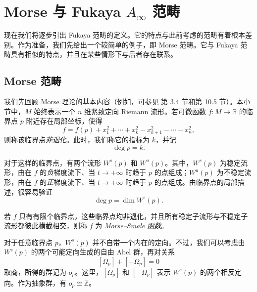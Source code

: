 \section{Morse 与 Fukaya \texorpdfstring{$A_\infty$}{A∞} 范畴}\label{sec:8.3}

现在我们将逐步引出 Fukaya 范畴的定义。它的特点与此前考虑的范畴有着根本差别。作为准备，我们先给出一个较简单的例子，即 Morse 范畴。它与 Fukaya 范畴具有相似的特点，并且在某些情形下与后者存在联系。

\subsection{Morse 范畴}\label{sec:8.3.1}

我们先回顾 Morse 理论的基本内容（例如，可参见  第 3.4 节和第 10.5 节）。本小节中，$M$ 始终表示一个 $n$ 维紧致定向 Riemann 流形。若可微函数 $f\colon M\to\mathbb R$ 的临界点 $p$ 附近存在局部坐标，使得
\[
f=f(p)+x_1^2+\cdots+x_k^2-x_{k+1}^2-\cdots-x_n^2,
\]
则称该临界点\emph{非退化}。此时，我们称它的指标为 $k$，并记
\[
\deg p=k.
\]

对于这样的临界点，有两个流形 $W^s(p)$ 和 $W^u(p)$。其中，$W^s(p)$ 为稳定流形，由在 $f$ 的\emph{负}梯度流下、当 $t\to+\infty$ 时趋于 $p$ 的点组成；$W^u(p)$ 为不稳定流形，由在 $f$ 的\emph{正}梯度流下、当 $t\to+\infty$ 时趋于 $p$ 的点组成。由临界点的局部描述，很容易验证
\[
\deg p=\dim W^s(p).
\]

\begin{definition}\label{def:8.9}
若 $f$ 只有有限个临界点，这些临界点均非退化，并且所有稳定子流形与不稳定子流形都彼此横截相交，则称 $f$ 为 \emph{Morse--Smale 函数}。
\end{definition}

对于任意临界点 $p$，$W^s(p)$ 并不自带一个内在的定向。不过，我们可以考虑由 $W^s(p)$ 的两个可能定向生成的自由 Abel 群，再对关系
\[
[\Omega_p]+[-\Omega_p]=0
\]
取商，所得的群记为 $o_p$。这里，$[\Omega_p]$ 和 $[-\Omega_p]$ 表示 $W^s(p)$ 的两个相反定向。作为抽象群，有 $o_p\cong\mathbb Z$。


